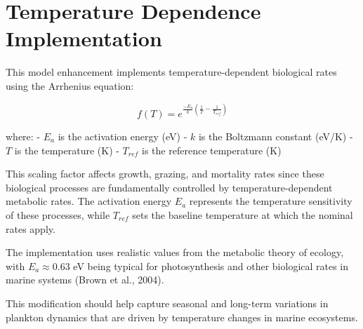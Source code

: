 \section{Temperature Dependence Implementation}

This model enhancement implements temperature-dependent biological rates using the Arrhenius equation:

\[ f(T) = e^{\frac{-E_a}{k} (\frac{1}{T} - \frac{1}{T_{ref}})} \]

where:
- $E_a$ is the activation energy (eV)
- $k$ is the Boltzmann constant (eV/K)
- $T$ is the temperature (K)
- $T_{ref}$ is the reference temperature (K)

This scaling factor affects growth, grazing, and mortality rates since these biological processes are fundamentally controlled by temperature-dependent metabolic rates. The activation energy $E_a$ represents the temperature sensitivity of these processes, while $T_{ref}$ sets the baseline temperature at which the nominal rates apply.

The implementation uses realistic values from the metabolic theory of ecology, with $E_a \approx 0.63$ eV being typical for photosynthesis and other biological rates in marine systems (Brown et al., 2004).

This modification should help capture seasonal and long-term variations in plankton dynamics that are driven by temperature changes in marine ecosystems.
